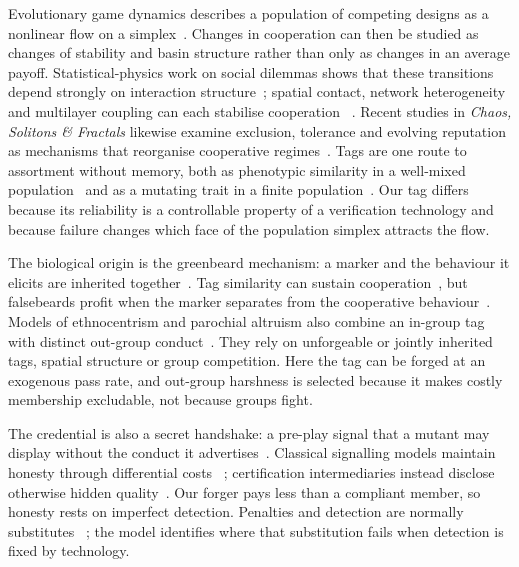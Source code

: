 \documentclass[a4paper,fleqn,longmktitle]{cas-sc}
\theoremstyle{plain}
\theoremstyle{definition}
\begin{document}
Evolutionary game dynamics describes a population of competing designs as a
nonlinear flow on a simplex~\citep{taylor1978ess,hofbauer1998evolutionary,hofbauer2003evolutionary}.
Changes in cooperation can then be studied as changes of stability and basin
structure rather than only as changes in an average payoff. Statistical-physics
work on social dilemmas shows that these transitions depend strongly on
interaction structure~\citep{perc2017statphys}; spatial contact, network
heterogeneity and multilayer coupling can each stabilise cooperation
~\citep{nowak1992spatial,santos2005scale,wang2015multilayer}. Recent studies in
\emph{Chaos, Solitons \& Fractals} likewise examine exclusion, tolerance and
evolving reputation as mechanisms that reorganise cooperative
regimes~\citep{ren2021tolerance,zhang2023expulsion,yue2025reputation}. Tags are
one route to assortment without memory, both as phenotypic similarity in a
well-mixed population~\citep{antal2009phenotypic} and as a mutating trait in a
finite population~\citep{traulsen2007chromodynamics}. Our tag differs because
its reliability is a controllable property of a verification technology and
because failure changes which face of the population simplex attracts the
flow.

The biological origin is the greenbeard mechanism: a marker and the behaviour
it elicits are inherited together~\citep{hamilton1964genetical1,dawkins1976selfish}.
Tag similarity can sustain cooperation~\citep{riolo2001evolution}, but
falsebeards profit when the marker separates from the cooperative
behaviour~\citep{jansen2006altruism,gardner2010greenbeards}. Models of
ethnocentrism and parochial altruism also combine an in-group tag with distinct
out-group conduct~\citep{hammond2006ethnocentrism,choi2007parochial}. They rely
on unforgeable or jointly inherited tags, spatial structure or group
competition. Here the tag can be forged at an exogenous pass rate, and
out-group harshness is selected because it makes costly membership excludable,
not because groups fight.

The credential is also a secret handshake: a pre-play signal that a mutant may
display without the conduct it advertises~\citep{robson1990efficiency}.
Classical signalling models maintain honesty through differential costs
~\citep{grafen1990biological,spence1973job}; certification intermediaries
instead disclose otherwise hidden quality~\citep{dranove2010quality}. Our
forger pays less than a compliant member, so honesty rests on imperfect
detection. Penalties and detection are normally substitutes
~\citep{becker1968crime}; the model identifies where that substitution fails
when detection is fixed by technology.
\end{document}
